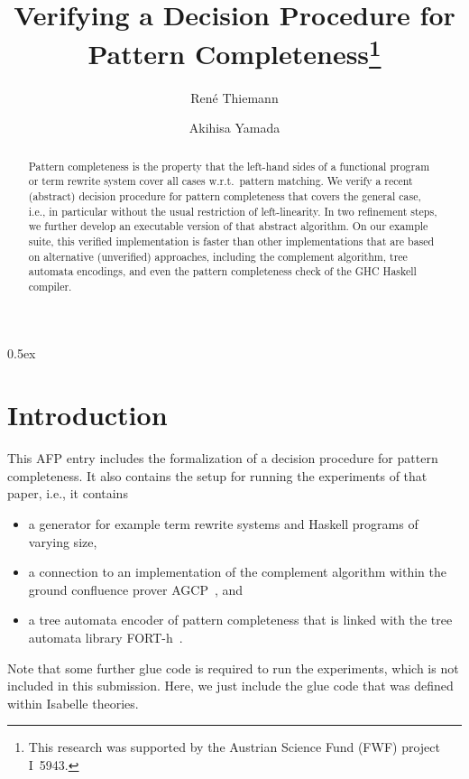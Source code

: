 \documentclass[11pt,a4paper]{article}
\begin{document}
\title{Verifying a Decision Procedure for Pattern Completeness\footnote{This research was supported by the Austrian Science Fund (FWF) project I~5943.}}
\author{Ren\'e Thiemann}
\author{Akihisa Yamada}
\maketitle

\begin{abstract}
Pattern completeness is the property that the left-hand sides of a functional
program or term rewrite system cover all cases w.r.t.\ pattern matching. 
We verify a recent (abstract) decision procedure 
for pattern completeness that covers the general case, i.e., in particular 
without the usual restriction of left-linearity.
In two refinement steps, we further develop an 
executable version of that abstract algorithm.
On our example suite, this verified implementation is faster 
than other implementations that are based
on alternative (unverified) approaches, including the complement algorithm, 
tree automata
encodings, and even the pattern completeness check of the GHC Haskell compiler.
\end{abstract}

\tableofcontents

\parindent 0pt\parskip 0.5ex

\section{Introduction}

This AFP entry includes the formalization of a decision procedure \cite{FSCD2024} 
for pattern completeness. It also contains 
the setup for running the experiments of that paper, i.e., 
it contains
\begin{itemize}
\item a generator for example term rewrite systems and Haskell programs of varying size,
\item a connection to an implementation of the complement algorithm \cite{LazrekLT90}
  within the ground confluence prover AGCP~\cite{AotoT2016}, and
\item a tree automata encoder of pattern completeness that is linked 
  with the tree automata library FORT-h~\cite{FORTh}.
\end{itemize}

Note that some further glue code is required to run the experiments, which is not
included in this submission. Here, we just include the glue code that was defined
within Isabelle theories.






\end{document}
